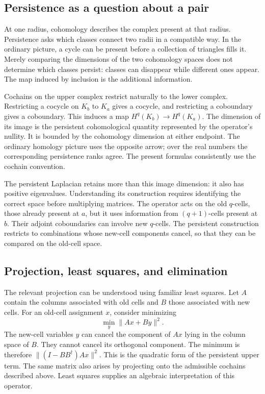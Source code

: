 \subsection{Persistence as a question about a pair}
At one radius, cohomology describes the complex present at that radius. Persistence asks which classes connect two radii in a compatible way. In the ordinary picture, a cycle can be present before a collection of triangles fills it. Merely comparing the dimensions of the two cohomology spaces does not determine which classes persist: classes can disappear while different ones appear. The map induced by inclusion is the additional information.

Cochains on the upper complex restrict naturally to the lower complex. Restricting a cocycle on $K_b$ to $K_a$ gives a cocycle, and restricting a coboundary gives a coboundary. This induces a map $H^q(K_b)\to H^q(K_a)$. The dimension of its image is the persistent cohomological quantity represented by the operator's nullity. It is bounded by the cohomology dimension at either endpoint. The ordinary homology picture uses the opposite arrow; over the real numbers the corresponding persistence ranks agree. The present formulas consistently use the cochain convention.

The persistent Laplacian retains more than this image dimension: it also has positive eigenvalues. Understanding its construction requires identifying the correct space before multiplying matrices. The operator acts on the old $q$-cells, those already present at $a$, but it uses information from $(q+1)$-cells present at $b$. Their adjoint coboundaries can involve new $q$-cells. The persistent construction restricts to combinations whose new-cell components cancel, so that they can be compared on the old-cell space.

\subsection{Projection, least squares, and elimination}
The relevant projection can be understood using familiar least squares. Let $A$ contain the columns associated with old cells and $B$ those associated with new cells. For an old-cell assignment $x$, consider minimizing
\begin{equation}
\min_y\|Ax+By\|^2.
\label{eq:tutorial-elimination}
\end{equation}
The new-cell variables $y$ can cancel the component of $Ax$ lying in the column space of $B$. They cannot cancel its orthogonal component. The minimum is therefore $\|(I-BB^\dagger)Ax\|^2$. This is the quadratic form of the persistent upper term. The same matrix also arises by projecting onto the admissible cochains described above. Least squares supplies an algebraic interpretation of this operator.


